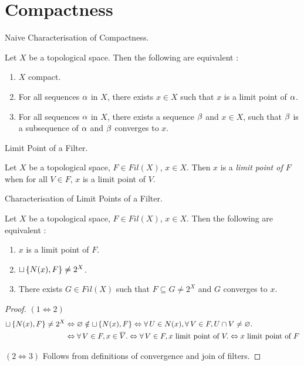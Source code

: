 \documentclass[main.tex]{subfiles}
\begin{document}
\section{Compactness}

\begin{rmk} Naive Characterisation of Compactness. 
  
  Let $X$ be a topological space. 
  Then the following are equivalent : 
  \begin{enumerate}
    \item $X$ compact. 
    \item For all sequences $\alpha$ in $X$, 
    there exists $x \in X$ such that $x$ is a limit point of $\alpha$.
    \item For all sequences $\alpha$ in $X$, 
    there exists a sequence $\beta$ and $x \in X$,
    such that $\beta$ is a subsequence of $\alpha$ and $\beta$ converges to $x$.
  \end{enumerate}
\end{rmk}

\begin{dfn} Limit Point of a Filter.
  
  Let $X$ be a topological space, $F \in Fil(X)$, $x \in X$.
  Then $x$ is a \emph{limit point of $F$} when
  for all $V \in F$, $x$ is a limit point of $V$.
\end{dfn}

\begin{thm} Characterisation of Limit Points of a Filter.
  
  Let $X$ be a topological space, $F \in Fil(X)$, $x \in X$. 
  Then the following are equivalent : 
  \begin{enumerate}
    \item $x$ is a limit point of $F$.
    \item $\sqcup\left\{N(x),F\right\} \neq 2^X$.
    \item There exists $G \in Fil(X)$ such that 
    $F \subseteq G \neq 2^X$ and $G$ converges to $x$.
  \end{enumerate}
\end{thm}
\begin{proof}
  $(1\iff 2)$
  \begin{align*}
    \sqcup\left\{N(x),F\right\} \neq 2^X 
    &\Leftrightarrow \varnothing \notin \sqcup\left\{N(x),F\right\}
    \Leftrightarrow \forall\, U \in N(x), \forall\, V \in F, U \cap V \neq \varnothing. \\
    &\Leftrightarrow \forall\, V \in F, x \in \overline{V}. 
    \Leftrightarrow \forall\, V \in F, x \text{ limit point of } V.
    \Leftrightarrow x \text{ limit point of } F
  \end{align*} 

  $(2\iff 3)$ Follows from definitions of convergence and join of filters.
\end{proof}
\end{document}
